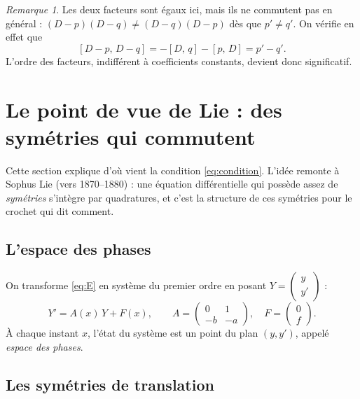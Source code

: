 \documentclass[11pt,a4paper]{article}
\theoremstyle{plain}
\theoremstyle{definition}
\theoremstyle{remark}
\newtheorem{remarque}[theoreme]{Remarque}
\newcommand{\Dx}{D}
\newcommand{\cro}[2]{\left[#1,\,#2\right]}
\begin{document}
\begin{remarque}
Les deux facteurs sont égaux ici, mais ils ne commutent pas en général : $(\Dx - p)(\Dx - q) \neq (\Dx - q)(\Dx - p)$ dès que $p' \neq q'$. On vérifie en effet que
\[
  \cro{\Dx - p}{\Dx - q} = -\cro{\Dx}{q} - \cro{p}{\Dx} = p' - q'.
\]
L'ordre des facteurs, indifférent à coefficients constants, devient donc significatif.
\end{remarque}

\section{Le point de vue de Lie : des symétries qui commutent}

Cette section explique d'où vient la condition \eqref{eq:condition}. L'idée remonte à Sophus Lie (vers 1870--1880) : une équation différentielle qui possède assez de \emph{symétries} s'intègre par quadratures, et c'est la structure de ces symétries pour le crochet qui dit comment.

\subsection{L'espace des phases}

On transforme \eqref{eq:E} en système du premier ordre en posant $Y = \begin{pmatrix} y \\ y' \end{pmatrix}$ :
\begin{equation}\label{eq:sys}
  Y' = A(x)\,Y + F(x),
  \qquad
  A = \begin{pmatrix} 0 & 1 \\ -b & -a \end{pmatrix},
  \quad
  F = \begin{pmatrix} 0 \\ f \end{pmatrix}.
\end{equation}
À chaque instant $x$, l'état du système est un point du plan $(y, y')$, appelé \emph{espace des phases}.

\subsection{Les symétries de translation}
\end{document}
